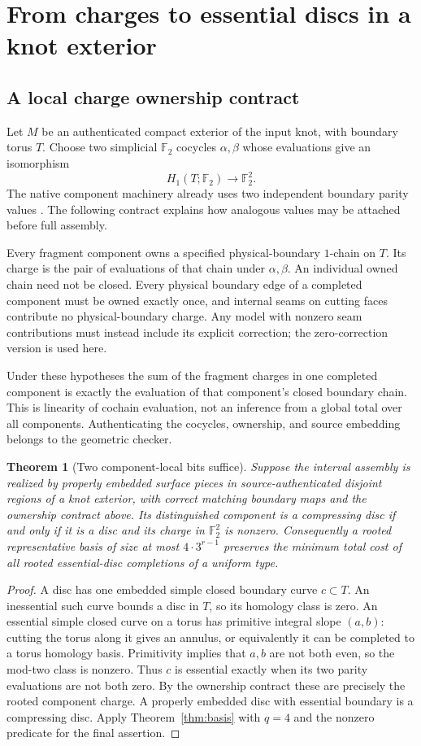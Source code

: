\documentclass[11pt,letterpaper]{article}
\newtheorem{theorem}{Theorem}[section]
\theoremstyle{definition}
\newcommand{\F}{\mathbb F}
\begin{document}
\section{From charges to essential discs in a knot exterior}\label{sec:peripheral}
\subsection{A local charge ownership contract}
Let $M$ be an authenticated compact exterior of the input knot, with boundary torus $T$. Choose two simplicial $\F_2$ cocycles $\alpha,\beta$ whose evaluations give an isomorphism
\[
 H_1(T;\F_2)\longrightarrow\F_2^2.
\]
The native component machinery already uses two independent boundary parity values \cite{weighted}. The following contract explains how analogous values may be attached before full assembly.

Every fragment component owns a specified physical-boundary $1$-chain on $T$. Its charge is the pair of evaluations of that chain under $\alpha,\beta$. An individual owned chain need not be closed. Every physical boundary edge of a completed component must be owned exactly once, and internal seams on cutting faces contribute no physical-boundary charge. Any model with nonzero seam contributions must instead include its explicit correction; the zero-correction version is used here.

Under these hypotheses the sum of the fragment charges in one completed component is exactly the evaluation of that component's closed boundary chain. This is linearity of cochain evaluation, not an inference from a global total over all components. Authenticating the cocycles, ownership, and source embedding belongs to the geometric checker.

\begin{theorem}[Two component-local bits suffice]\label{thm:essential}
Suppose the interval assembly is realized by properly embedded surface pieces in source-authenticated disjoint regions of a knot exterior, with correct matching boundary maps and the ownership contract above. Its distinguished component is a compressing disc if and only if it is a disc and its charge in $\F_2^2$ is nonzero. Consequently a rooted representative basis of size at most $4\cdot3^{r-1}$ preserves the minimum total cost of all rooted essential-disc completions of a uniform type.
\end{theorem}
\begin{proof}
A disc has one embedded simple closed boundary curve $c\subset T$. An inessential such curve bounds a disc in $T$, so its homology class is zero. An essential simple closed curve on a torus has primitive integral slope $(a,b)$: cutting the torus along it gives an annulus, or equivalently it can be completed to a torus homology basis. Primitivity implies that $a,b$ are not both even, so the mod-two class is nonzero. Thus $c$ is essential exactly when its two parity evaluations are not both zero. By the ownership contract these are precisely the rooted component charge. A properly embedded disc with essential boundary is a compressing disc. Apply Theorem~\ref{thm:basis} with $q=4$ and the nonzero predicate for the final assertion.
\end{proof}
\end{document}
